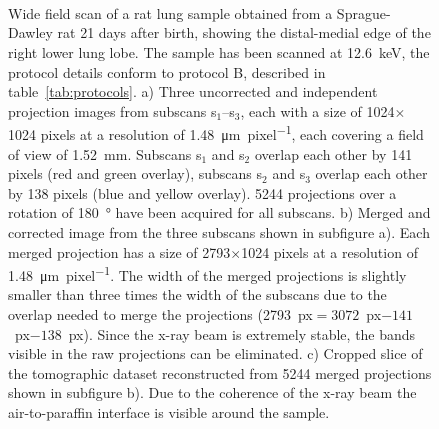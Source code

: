 \ifiucr
	\begin{figure}%
			\caption{Wide field scan of a rat lung sample obtained from a Sprague-Dawley rat 21 days after birth, showing the distal-medial edge of the right lower lung lobe. The sample has been scanned at \SI{12.6}{\kilo\electronvolt}, the protocol details conform to protocol B, described in table~\ref{tab:protocols}. %
		a) Three uncorrected and independent projection images from subscans s$_1$--s$_3$, each with a size of 1024\(\times\)1024 pixels at a resolution of \SI{1.48}{\micro\meter\per pixel}, each covering a field of view of \SI{1.52}{\milli\meter}. Subscans s$_1$ and s$_2$ overlap each other by 141 pixels (red and green overlay), subscans s$_2$ and s$_3$ overlap each other by 138 pixels (blue and yellow overlay). 5244 projections over a rotation of \SI{180}{\degree} have been acquired for all subscans. %
		b) Merged and corrected image from the three subscans shown in subfigure a). Each merged projection has a size of 2793\(\times\)1024 pixels at a resolution of \SI{1.48}{\micro\meter\per pixel}. The width of the merged projections is slightly smaller than three times the width of the subscans due to the overlap needed to merge the projections (2793~px$=3072$~px$-141$~px$-138$~px). Since the x-ray beam is extremely stable, the bands visible in the raw projections can be eliminated. %
		c) Cropped slice of the tomographic dataset reconstructed from 5244 merged projections shown in subfigure b). Due to the coherence of the x-ray beam the air-to-paraffin interface is visible around the sample.%
		}%
		\label{fig:wide field scan results}%
		\\%
		\\%
		\\%
	\end{figure}%
\else
